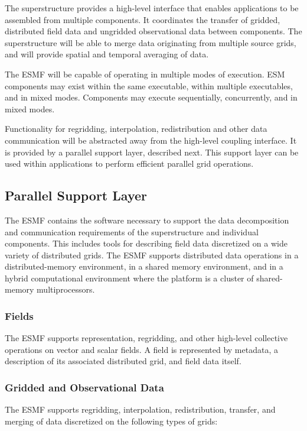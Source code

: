 The superstructure provides a high-level interface that enables 
applications to be assembled from multiple components.  It coordinates
the transfer of gridded, distributed field data and ungridded 
observational data between components.  The superstructure will be able 
to merge data originating from multiple source grids, and will 
provide spatial and temporal averaging of data.

The ESMF will be capable of operating in multiple modes of execution.
ESM components may exist within the same executable, within multiple 
executables, and in mixed modes.  Components may execute sequentially, 
concurrently, and in mixed modes.  

Functionality for regridding, interpolation, redistribution and other 
data communication will be abstracted away from the high-level coupling
interface.  It is provided by a parallel support layer, described next.  
This support layer can be used within applications 
to perform efficient parallel grid operations.

\subsection{Parallel Support Layer}

The ESMF contains the software necessary to support the data
decomposition and communication requirements of the superstructure and
individual components.  This includes tools for describing field
data discretized on a wide variety of distributed grids.  The ESMF
supports distributed data operations in a distributed-memory environment, 
in a shared memory environment, and in a hybrid computational environment 
where the platform is a cluster of shared-memory multiprocessors.

\subsubsection{Fields}
The ESMF supports representation, regridding, and other high-level
collective operations on vector and scalar fields.  A field is represented 
by metadata, a description of its associated distributed grid, and field 
data itself.

\subsubsection{Gridded and Observational Data}

The ESMF supports regridding, interpolation, redistribution,
transfer, and merging of data discretized on the following types of grids:

